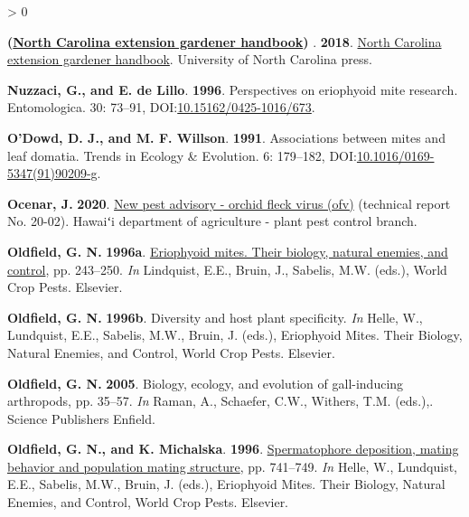 \documentclass{ufdissertation}[overrideChapters] %
\newlength{\cslhangindent}
\newenvironment{CSLReferences}[2] %
 {%
  \setlength{\parindent}{0pt}
  \ifodd #1 \everypar{\setlength{\hangindent}{\cslhangindent}}\ignorespaces\fi
  \ifnum #2 > 0
  \setlength{\parskip}{#2\baselineskip}
  \fi
 }%
 {}
\begin{document}
{\begin{CSLReferences}{1}{1}
\leavevmode{}%
\textbf{(\href{https://www.ebook.de/de/product/32731736/north_carolina_extension_gardener_handbook.html}{{North Carolina} extension gardener handbook}) }. \textbf{2018}. \href{https://www.ebook.de/de/product/32731736/north_carolina_extension_gardener_handbook.html}{{North Carolina} extension gardener handbook}. University of {North Carolina} press.

\leavevmode{}%
\textbf{Nuzzaci, G., and E. de Lillo}. \textbf{1996}. Perspectives on eriophyoid mite research. Entomologica. 30: 73--91, DOI:\href{https://doi.org/10.15162/0425-1016/673}{10.15162/0425-1016/673}.

\leavevmode{}%
\textbf{O'Dowd, D. J., and M. F. Willson}. \textbf{1991}. Associations between mites and leaf domatia. Trends in Ecology {\&} Evolution. 6: 179--182, DOI:\href{https://doi.org/10.1016/0169-5347(91)90209-g}{10.1016/0169-5347(91)90209-g}.

\leavevmode{}%
\textbf{Ocenar, J.} \textbf{2020}. \href{https://hdoa.hawaii.gov/pi/files/2020/08/NPA-20-02-Orchid-fleck-virus.pdf}{New pest advisory - orchid fleck virus (ofv)} (technical report No. 20-02). Hawaiʻi department of agriculture - plant pest control branch.

\leavevmode{}%
\textbf{Oldfield, G. N.} \textbf{1996a}. \href{https://doi.org/10.1016/s1572-4379(96)80015-7}{Eriophyoid mites. Their biology, natural enemies, and control}, pp. 243--250. \emph{In} Lindquist, E.E., Bruin, J., Sabelis, M.W. (eds.), World Crop Pests. Elsevier.

\leavevmode{}%
\textbf{Oldfield, G. N.} \textbf{1996b}. Diversity and host plant specificity. \emph{In} Helle, W., Lundquist, E.E., Sabelis, M.W., Bruin, J. (eds.), Eriophyoid Mites. Their Biology, Natural Enemies, and Control, World Crop Pests. Elsevier.

\leavevmode{}%
\textbf{Oldfield, G. N.} \textbf{2005}. Biology, ecology, and evolution of gall-inducing arthropods, pp. 35--57. \emph{In} Raman, A., Schaefer, C.W., Withers, T.M. (eds.),. Science Publishers Enfield.

\leavevmode{}%
\textbf{Oldfield, G. N., and K. Michalska}. \textbf{1996}. \href{https://doi.org/10.1016/s1572-4379(96)80050-9}{Spermatophore deposition, mating behavior and population mating structure}, pp. 741--749. \emph{In} Helle, W., Lundquist, E.E., Sabelis, M.W., Bruin, J. (eds.), Eriophyoid Mites. Their Biology, Natural Enemies, and Control, World Crop Pests. Elsevier.


\end{CSLReferences}}
\end{document}

